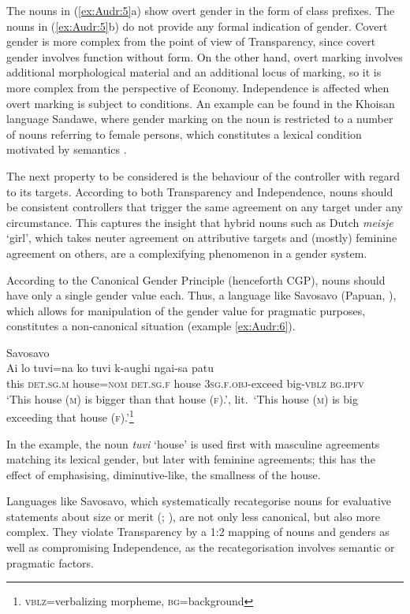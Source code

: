 \documentclass[output=collectionpaper]{langsci/langscibook}
\begin{document}
The nouns in (\ref{ex:Audr:5}a) show overt gender in the form of class prefixes. The nouns in (\ref{ex:Audr:5}b) do not provide any formal indication of gender. Covert gender is more complex from the point of view of Transparency, since covert gender involves function without form. On the other hand, overt marking involves additional morphological material and an additional locus of marking, so it is more complex from the perspective of Economy. Independence is affected when overt marking is subject to conditions. An example can be found in the Khoisan language Sandawe, where gender marking on the noun is restricted to a number of nouns referring to female persons, which constitutes a lexical condition motivated by semantics \citep[57]{Steeman2011}.

The next property to be considered is the behaviour of the controller with regard to its targets. According to both Transparency and Independence, nouns should be consistent controllers that trigger the same agreement on any target under any circumstance. This captures the insight that hybrid nouns such as Dutch \textit{meisje} `girl', which takes neuter agreement on attributive targets and (mostly) feminine agreement on others, are a complexifying phenomenon in a gender system.

According to the Canonical Gender Principle (henceforth CGP), nouns should have only a single gender value each. Thus, a language like Savosavo (Papuan, \citealt{Wegener2012}), which allows for manipulation of the gender value for pragmatic purposes, constitutes a non-canonical situation (example \ref{ex:Audr:6}).

\ea
\label{ex:Audr:6}
Savosavo \citep[64]{Wegener2012}\\
\gll Ai lo tuvi=na ko tuvi k-aughi ngai-sa patu\\
     this \textsc{det.sg.m} house=\textsc{nom} \textsc{det.sg.f} house \textsc{3sg.f.obj}{}-exceed big-\textsc{vblz} \textsc{bg.ipfv}\\
\glt `This house (\textsc{m}) is bigger than that house (\textsc{f}).', lit.\ `This house (\textsc{m}) is big exceeding that house (\textsc{f}).'\footnote{\textsc{vblz}=verbalizing morpheme, \textsc{bg}=background}
\z

In the example, the noun \textit{tuvi} `house' is used first with masculine agreements matching its lexical gender, but later with feminine agreements; this has the effect of emphasising, diminutive-like, the smallness of the house.

Languages like Savosavo, which systematically recategorise nouns for evaluative statements about size or merit (\citealt[123]{Corbett2014}; \citealt[179]{DiGarbo2014}), are not only less canonical, but also more complex. They violate Transparency by a 1:2 mapping of nouns and genders as well as compromising Independence, as the recategorisation involves semantic or pragmatic factors.
\end{document}
